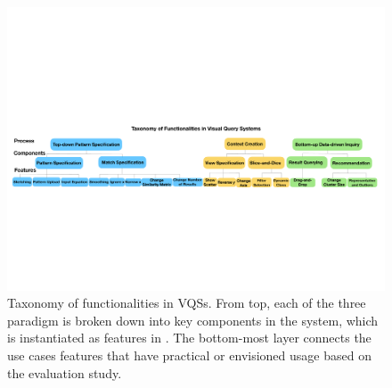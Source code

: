 \begin{figure}[ht!]
  \centering
  \includegraphics[width=\linewidth]{figures/full_taxonomy_invert.pdf}
  \caption{Taxonomy of functionalities in VQSs. From top, each of the three paradigm is broken down into key components in the system, which is instantiated as features in \zvpp. The bottom-most layer connects the use cases features that have practical or envisioned usage based on the evaluation study.}
  \label{fig:taxonomy}
\end{figure}
